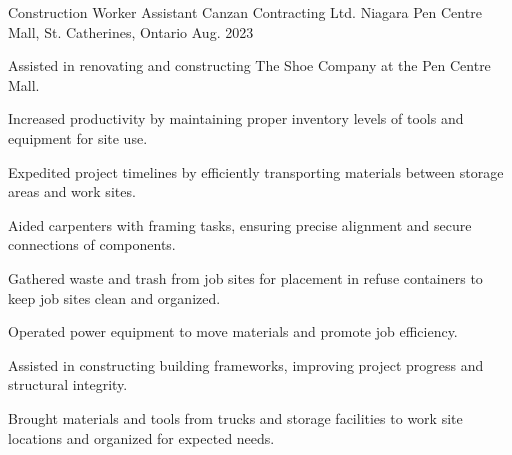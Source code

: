 

\begin{cventries}
  \cventry
    {Construction Worker Assistant} %
    {Canzan Contracting Ltd.} %
    {Niagara Pen Centre Mall, St. Catherines, Ontario} %
    {Aug. 2023} %
    {
      \begin{cvitems} %
        \item {Assisted in renovating and constructing The Shoe Company at the Pen Centre Mall.}
        \item {Increased productivity by maintaining proper inventory levels of tools and equipment for site use.}
        \item {Expedited project timelines by efficiently transporting materials between storage areas and work sites.}
        \item {Aided carpenters with framing tasks, ensuring precise alignment and secure connections of components.}
        \item {Gathered waste and trash from job sites for placement in refuse containers to keep job sites clean and organized.}
        \item {Operated power equipment to move materials and promote job efficiency.}
        \item {Assisted in constructing building frameworks, improving project progress and structural integrity.}
        \item {Brought materials and tools from trucks and storage facilities to work site locations and organized for expected needs.}
      \end{cvitems}
    }


\end{cventries}
